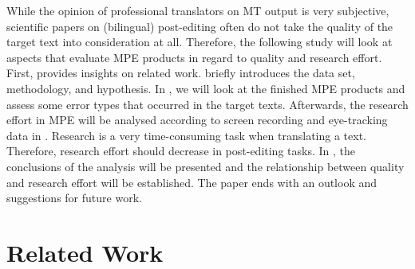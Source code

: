 \documentclass[output=paper]{langsci/langscibook}
\begin{document}
While the opinion of professional translators on MT output is very subjective, scientific papers on (bilingual) post-editing often do not take the quality of the target text into consideration at all. Therefore, the following study will look at aspects that evaluate MPE products in regard to quality and research effort. First,  provides insights on related work.  briefly introduces the data set, methodology, and hypothesis. In , we will look at the finished MPE products and assess some error types that occurred in the target texts. Afterwards, the research effort in MPE will be analysed according to screen recording and eye-tracking data in . Research is a very time-consuming task when translating a text. Therefore, research effort should decrease in post-editing tasks. In , the conclusions of the analysis will be presented and the relationship between quality and research effort will be established. The paper ends with an outlook and suggestions for future work.


\section{Related Work\label{nitzke:sec:RelatedWork}}
\end{document}

